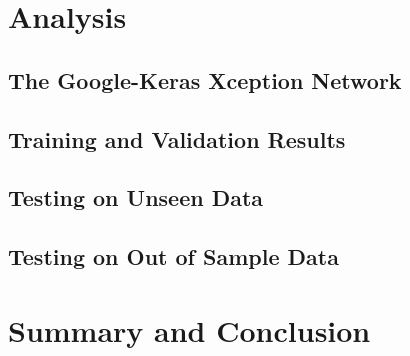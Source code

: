 \documentclass[a4paper,11pt]{article} %
\begin{document}
\section{Analysis}
\blindtext

\subsection{The Google-Keras Xception Network}
\blindtext

\subsection{Training and Validation Results}
\blindtext

\subsection{Testing on Unseen Data}
\blindtext

\subsection{Testing on Out of Sample Data}
\blindtext

\section{Summary and Conclusion}
\blindtext

\printbibliography
\end{document}

